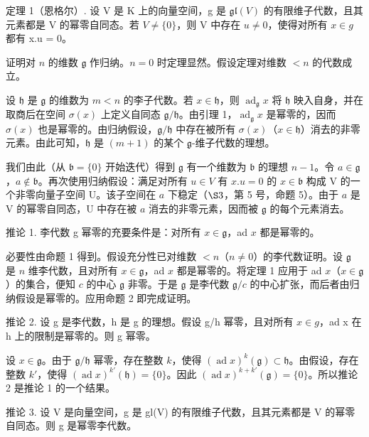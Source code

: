 定理 1（恩格尔）. 设 V 是 K 上的向量空间，g 是 \(\mathfrak{gl}(V)\) 的有限维子代数，且其元素都是 V 的幂零自同态。若 \(V \neq \{0\}\)，则 V 中存在 \(u \neq 0\)，使得对所有 \(x \in g\) 都有 x.u = 0。

证明对 \(n\) 的维数 \(\mathfrak{g}\) 作归纳。\(n = 0\) 时定理显然。假设定理对维数 \(< n\) 的代数成立。

设 \(\mathfrak{h}\) 是 \(\mathfrak{g}\) 的维数为 \(m < n\) 的李子代数。若 \(x \in \mathfrak{h}\)，则 \(\operatorname{ad}_{\mathfrak{g}} x\) 将 \(\mathfrak{h}\) 映入自身，并在取商后在空间 \(\sigma(x)\) 上定义自同态 \(\mathfrak{g} / \mathfrak{h}\)。由引理 1，\(\operatorname{ad}_{\mathfrak{g}} x\) 是幂零的，因而 \(\sigma(x)\) 也是幂零的。由归纳假设，\(\mathfrak{g} / \mathfrak{h}\) 中存在被所有 \(\sigma(x)\)（\(x \in \mathfrak{h}\)）消去的非零元素。由此可知，\(\mathfrak{h}\) 是 \((m + 1)\) 的某个 \(\mathfrak{g}\)-维子代数的理想。

我们由此（从 \(\mathfrak{b} = \{0\}\) 开始迭代）得到 \(\mathfrak{g}\) 有一个维数为 \(\mathfrak{b}\) 的理想 \(n - 1\)。令 \(a \in \mathfrak{g}\)，\(a \notin \mathfrak{b}\)。再次使用归纳假设：满足对所有 \(u \in V\) 有 \(x.u = 0\) 的 \(x \in \mathfrak{b}\) 构成 V 的一个非零向量子空间 U。该子空间在 \(a\) 下稳定（\(\S 3\)，第 5 号，命题 5）。由于 \(a\) 是 V 的幂零自同态，U 中存在被 \(a\) 消去的非零元素，因而被 \(\mathfrak{g}\) 的每个元素消去。

推论 1. 李代数 g 幂零的充要条件是：对所有 \(x \in \mathfrak{g}\)，ad \(x\) 都是幂零的。

必要性由命题 1 得到。假设充分性已对维数 \(< n\)（\(n \neq 0\)）的李代数证明。设 \(\mathfrak{g}\) 是 \(n\) 维李代数，且对所有 \(x \in \mathfrak{g}\)，ad \(x\) 都是幂零的。将定理 1 应用于 ad \(x\)（\(x \in \mathfrak{g}\)）的集合，便知 \(c\) 的中心 \(\mathfrak{g}\) 非零。于是 \(\mathfrak{g}\) 是李代数 \(\mathfrak{g}/c\) 的中心扩张，而后者由归纳假设是幂零的。应用命题 2 即完成证明。

推论 2. 设 g 是李代数，h 是 g 的理想。假设 g/h 幂零，且对所有 \(x \in g\)，ad x 在 h 上的限制是幂零的。则 g 幂零。

设 \(x \in \mathfrak{g}\)。由于 \(\mathfrak{g} / \mathfrak{h}\) 幂零，存在整数 \(k\)，使得 \((\operatorname{ad} x)^k(\mathfrak{g}) \subset \mathfrak{h}\)。由假设，存在整数 \(k'\)，使得 \((\operatorname{ad} x)^{k'}(\mathfrak{h}) = \{0\}\)。因此 \((\operatorname{ad} x)^{k + k'}(\mathfrak{g}) = \{0\}\)。所以推论 2 是推论 1 的一个结果。

推论 3. 设 V 是向量空间，g 是 gl(V) 的有限维子代数，且其元素都是 V 的幂零自同态。则 g 是幂零李代数。

